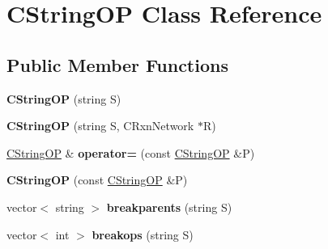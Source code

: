 \hypertarget{class_c_string_o_p}{}\section{C\+String\+OP Class Reference}
\label{class_c_string_o_p}
\subsection*{Public Member Functions}
\begin{DoxyCompactItemize}
\item 
\mbox{\label{class_c_string_o_p_aabc4096e8382107167011e24d771d052}} 
{\bfseries C\+String\+OP} (string S)
\item 
\mbox{\label{class_c_string_o_p_ad660c2d93c90d1a2b9d5ac63f9cc1afb}} 
{\bfseries C\+String\+OP} (string S, C\+Rxn\+Network $\ast$R)
\item 
\mbox{\label{class_c_string_o_p_a7f2c265dcae6b1982523a5a584de1e02}} 
\hyperlink{class_c_string_o_p}{C\+String\+OP} \& {\bfseries operator=} (const \hyperlink{class_c_string_o_p}{C\+String\+OP} \&P)
\item 
\mbox{\label{class_c_string_o_p_a73faba9c9f83c95a134ac20e64b6b2fd}} 
{\bfseries C\+String\+OP} (const \hyperlink{class_c_string_o_p}{C\+String\+OP} \&P)
\item 
\mbox{\label{class_c_string_o_p_a60bb023a8a0d4c619af61d37e9126cbd}} 
vector$<$ string $>$ {\bfseries breakparents} (string S)
\item 
\mbox{\label{class_c_string_o_p_afcb0a2eebccaf6f9ef408e5010129e9f}} 
vector$<$ int $>$ {\bfseries breakops} (string S)
\end{DoxyCompactItemize}
